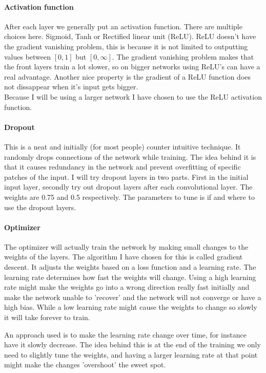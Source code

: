 \documentclass[11pt]{article}
\begin{document}
\paragraph{Activation function}
After each layer we generally put an activation function. There are multiple choices here. Sigmoid, Tanh or Rectified linear unit (ReLU). ReLU doesn't have the gradient vanishing problem, this is because it is not limited to outputting values between $[0,1]$ but $[0,\infty]$. The gradient vanishing problem makes that the front layers train a lot slower, so on bigger networks using ReLU's can have a real advantage. Another nice property is the gradient of a ReLU function does not dissappear when it's input gets bigger.\\

Because I will be using a larger network I have chosen to use the ReLU activation function.

\paragraph{Dropout}
This is a neat and initially (for most people) counter intuitive technique. It randomly drops connections of the network while training. The idea behind it is that it causes redundancy in the network and prevent overfitting of specific patches of the input. I will try dropout layers in two parts. First in the initial input layer, secondly try out dropout layers after each convolutional layer. The weights are 0.75 and 0.5 respectively. The parameters to tune is if and where to use the dropout layers.

\paragraph{Optimizer} The optimizer will actually train the network by making small changes to the  weights of the layers. The algorithm I have chosen for this is called gradient descent. It adjusts the weights based on a loss function and a learning rate. The learning rate determines how fast the weights will change. Using a high learning rate might make the weights go into a wrong direction really fast initially and make the network unable to 'recover' and the network will not converge or have a high bias. While a low learning rate might cause the weights to change so slowly it will take forever to train.

An approach used is to make the learning rate change over time, for instance have it slowly decrease. The idea behind this is at the end of the training we only need to slightly tune the weights, and having a larger learning rate at that point might make the changes 'overshoot' the sweet spot.
\end{document}
